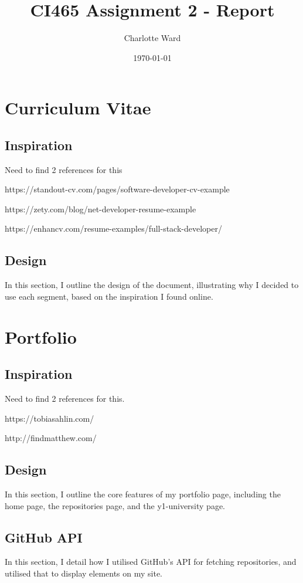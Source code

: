 \documentclass{scrartcl}
\begin{document}
\author{Charlotte Ward}
\date{\today}
\title{
CI465 Assignment 2 - Report
}
\maketitle

\tableofcontents

\section{Curriculum Vitae}

\subsection{Inspiration}

Need to find 2 references for this

https://standout-cv.com/pages/software-developer-cv-example

https://zety.com/blog/net-developer-resume-example

https://enhancv.com/resume-examples/full-stack-developer/

\subsection{Design}

In this section, I outline the design of the document, illustrating why I decided to use each segment, based on the inspiration I found online.

\section{Portfolio}

\subsection{Inspiration}

Need to find 2 references for this.

https://tobiasahlin.com/

http://findmatthew.com/

\subsection{Design}

In this section, I outline the core features of my portfolio page, including the home page, the repositories page, and the y1-university page.

\subsection{GitHub API}

In this section, I detail how I utilised GitHub's API for fetching repositories, and utilised that to display elements on my site.

\printbibliography
\end{document}
